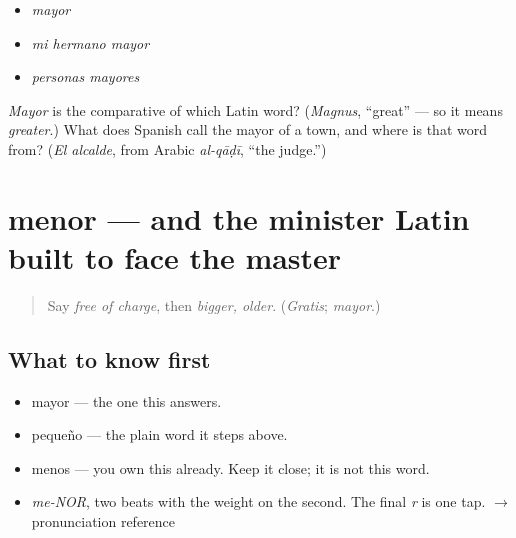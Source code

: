 \begin{itemize}
\raggedright
  \item \emph{mayor}
  \item \emph{mi hermano mayor}
  \item \emph{personas mayores}
\end{itemize}

\begin{tcolorbox}[breakable,colback=teal!4,colframe=teal!35!black,title={Before you move on}]
\emph{Mayor} is the comparative of which Latin word? (\emph{Magnus}, \textquotedblleft{}great\textquotedblright{} — so it means \emph{greater}.) What does Spanish call the mayor of a town, and where is that word from? (\emph{El alcalde}, from Arabic \emph{al-qāḍī}, \textquotedblleft{}the judge.\textquotedblright{})
\end{tcolorbox}
\section[menor]{menor — and the minister Latin built to face the master}

\label{lesson:ES-C397-menor}



\begin{quote}
Say \emph{free of charge}, then \emph{bigger, older}. (\emph{Gratis}; \emph{mayor}.)
\end{quote}

\subsection*{What to know first}
\begin{itemize}
\raggedright
  \item mayor — the one this answers.
  \item pequeño — the plain word it steps above.
  \item menos — you own this already. Keep it close; it is not this word.
\end{itemize}

\begin{sounds}
\begin{itemize}
\raggedright
  \item \emph{me-NOR}, two beats with the weight on the second. The final \emph{r} is one tap. $\to$ pronunciation reference
\end{itemize}
\end{sounds}

